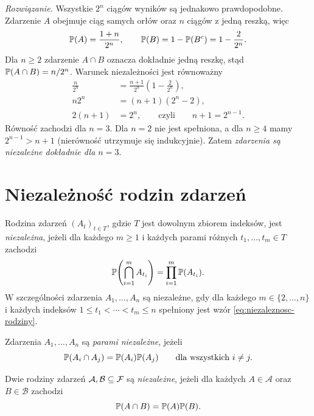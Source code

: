 \noindent\emph{Rozwiązanie.}
Wszystkie $2^n$ ciągów wyników są jednakowo prawdopodobne.
Zdarzenie $A$ obejmuje ciąg samych orłów oraz $n$ ciągów z jedną reszką,
więc
\[
  \mathbb{P}(A)=\frac{1+n}{2^n},
  \qquad \mathbb{P}(B)=1-\mathbb{P}(B^c)=1-\frac2{2^n}.
\]
Dla $n\geq2$ zdarzenie $A\cap B$ oznacza dokładnie jedną reszkę,
stąd $\mathbb{P}(A\cap B)=n/2^n$. Warunek niezależności jest równoważny
\begin{align*}
  \frac{n}{2^n}
    &=\frac{n+1}{2^n}\left(1-\frac2{2^n}\right),\\
  n2^n&=(n+1)(2^n-2),\\
  2(n+1)&=2^n,
  \qquad\text{czyli}\qquad n+1=2^{n-1}.
\end{align*}
Równość zachodzi dla $n=3$. Dla $n=2$ nie jest spełniona,
a dla $n\geq4$ mamy $2^{n-1}>n+1$ (nierówność utrzymuje się indukcyjnie).
Zatem \emph{zdarzenia są niezależne dokładnie dla $n=3$}.

\section{Niezależność rodzin zdarzeń}
\label{sec:niezaleznosc-rodzin}

\begin{definicja}
\label{def:niezaleznosc-rodziny}
Rodzina zdarzeń $(A_t)_{t\in T}$, gdzie $T$ jest dowolnym zbiorem indeksów,
jest \emph{niezależna}, jeżeli dla każdego $m\geq1$ i każdych parami różnych
$t_1,\ldots,t_m\in T$ zachodzi
\begin{equation}
  \mathbb{P}\!\left(\bigcap_{i=1}^{m}A_{t_i}\right)
    =\prod_{i=1}^{m}\mathbb{P}(A_{t_i}).
  \label{eq:niezaleznosc-rodziny}
\end{equation}
W szczególności zdarzenia $A_1,\ldots,A_n$ są niezależne, gdy
dla każdego $m\in\{2,\ldots,n\}$ i każdych indeksów
$1\leq t_1<\cdots<t_m\leq n$ spełniony jest wzór
\eqref{eq:niezaleznosc-rodziny}.
\end{definicja}

\begin{definicja}
\label{def:niezaleznosc-parami}
Zdarzenia $A_1,\ldots,A_n$ są \emph{parami niezależne}, jeżeli
\[
  \mathbb{P}(A_i\cap A_j)=\mathbb{P}(A_i)\mathbb{P}(A_j)
  \qquad\text{dla wszystkich }i\ne j.
\]
\end{definicja}

\begin{definicja}
\label{def:dwie-rodziny}
Dwie rodziny zdarzeń $\mathcal{A},\mathcal{B}\subseteq\mathcal{F}$
są \emph{niezależne}, jeżeli dla każdych
$A\in\mathcal{A}$ oraz $B\in\mathcal{B}$ zachodzi
\[
  \mathbb{P}(A\cap B)=\mathbb{P}(A)\mathbb{P}(B).
\]
\end{definicja}

